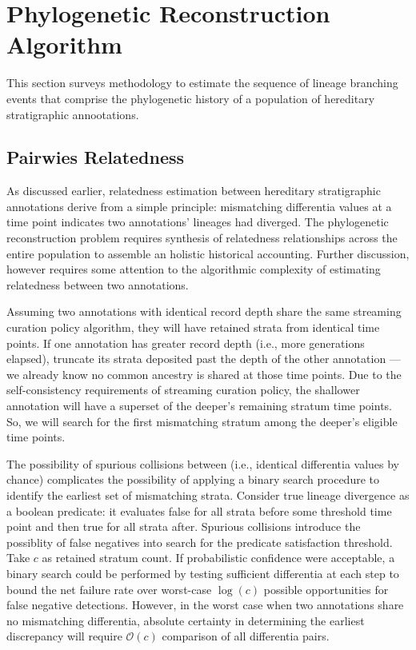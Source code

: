 \section{Phylogenetic Reconstruction Algorithm} \label{sec:reconstruction}

This section surveys methodology to estimate the sequence of lineage branching events that comprise the phylogenetic history of a population of hereditary stratigraphic annootations.

\subsection{Pairwies Relatedness} \label{sec:pairwise-relatedness}

As discussed earlier, relatedness estimation between hereditary stratigraphic annotations derive from a simple principle: mismatching differentia values at a time point indicates two annotations' lineages had diverged.
The phylogenetic reconstruction problem requires synthesis of relatedness relationships across the entire population to assemble an holistic historical accounting.
Further discussion, however requires some attention to the algorithmic complexity of estimating relatedness between two annotations.

Assuming two annotations with identical record depth share the same streaming curation policy algorithm, they will have retained strata from identical time points.
If one annotation has greater record depth (i.e., more generations elapsed), truncate its strata deposited past the depth of the other annotation --- we already know no common ancestry is shared at those time points.
Due to the self-consistency requirements of streaming curation policy, the shallower annotation will have a superset of the deeper's remaining stratum time points.
So, we will search for the first mismatching stratum among the deeper's eligible time points.

The possibility of spurious collisions between (i.e., identical differentia values by chance) complicates the possibility of applying a binary search procedure to identify the earliest set of mismatching strata.
Consider true lineage divergence as a boolean predicate: it evaluates false for all strata before some threshold time point and then true for all strata after. 
Spurious collisions introduce the possiblity of false negatives into search for the predicate satisfaction threshold.
Take $c$ as retained stratum count.
If probabilistic confidence were acceptable, a binary search could be performed by testing sufficient differentia at each step to bound the net failure rate over worst-case $\log (c)$ possible opportunities for false negative detections.
However, in the worst case when two annotations share no mismatching differentia, absolute certainty in determining the earliest discrepancy will require $\mathcal{O}(c)$ comparison of all differentia pairs. 

